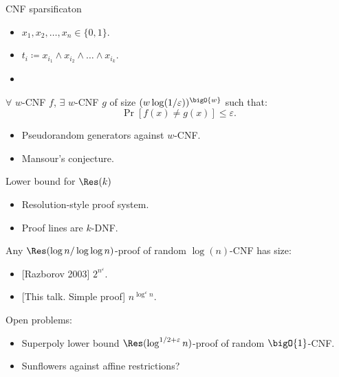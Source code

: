 \begin{frame}{CNF sparsificaton}

    \begin{itemize}
        \item $x_1, x_2, \dots, x_n \in \{0, 1\}$.
        \item $t_i \coloneqq x_{i_1} \land x_{i_2} \land \dots \land x_{i_k}$.
        \item {}
    \end{itemize}

    \pause
    \pause

    \begin{theorem}
        \alert{$\forall$} $w$-CNF $f$, \alert{$\exists$} $w$-CNF $g$ of size $(w \log(1 /
        \varepsilon))^{\bigO{w}}$ such that:
        $$
            \Pr[f(x) \neq g(x)] \le \varepsilon.
        $$
    \end{theorem}

    \pause
    \begin{itemize}
        \item Pseudorandom generators against $w$-CNF.
        \item Mansour's conjecture.
    \end{itemize}
    
\end{frame}

\begin{frame}{Lower bound for $\Res(k)$}

    \begin{itemize}
        \item Resolution-style proof system.
        \item Proof lines are $k$-DNF.
    \end{itemize}

    \pause
    \begin{theorem}
        Any $\Res(\log n / \log \log n)$-proof of random $\log(n)$-CNF has size:
        \begin{itemize}
            \item{} [Razborov 2003] $2^{n^{\varepsilon}}$.
            \item{} [This talk. Simple proof] $n^{\log^{\varepsilon} n}$.
        \end{itemize}
    \end{theorem}

    \pause
    \vspace{1cm}
    Open problems:
    \begin{itemize}
        \item Superpoly lower bound $\Res(\log^{1 / 2 + \varepsilon} n)$-proof of random $\bigO{1}$-CNF.
        \item Sunflowers against affine restrictions?
    \end{itemize}
\end{frame}

